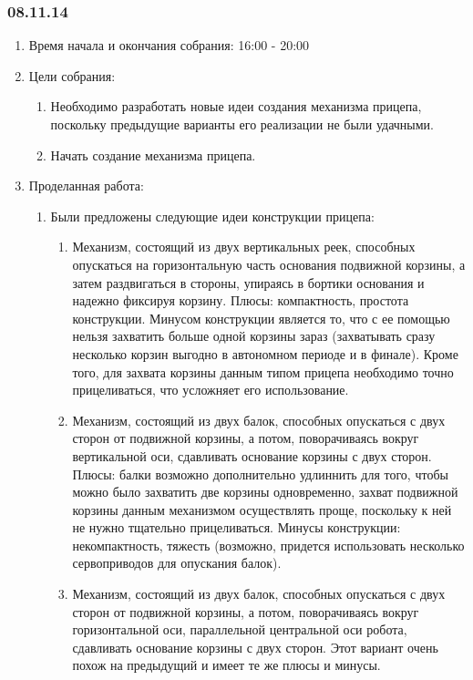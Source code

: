 
\subsubsection{08.11.14}

\begin{enumerate}
	\item Время начала и окончания собрания:
	16:00 - 20:00
	\item Цели собрания:
	\begin{enumerate}
		\item Необходимо разработать новые идеи создания механизма прицепа, поскольку предыдущие варианты его реализации не были удачными.
		
		\item Начать создание механизма прицепа.
		
	\end{enumerate}
	
	\item Проделанная работа:
	\begin{enumerate}
		\item Были предложены следующие идеи конструкции прицепа:
		\begin{enumerate}
			\item Механизм, состоящий из двух вертикальных реек, способных опускаться на горизонтальную часть основания подвижной корзины, а затем раздвигаться в стороны, упираясь в бортики основания и надежно фиксируя корзину. Плюсы: компактность, простота конструкции. Минусом конструкции является то, что с ее помощью нельзя захватить больше одной корзины зараз (захватывать сразу несколько корзин выгодно в автономном периоде и в финале). Кроме того, для захвата корзины данным типом прицепа необходимо точно прицеливаться, что усложняет его использование.
			
			\item Механизм, состоящий из двух балок, способных опускаться с двух сторон от подвижной корзины, а потом, поворачиваясь вокруг вертикальной оси, сдавливать основание корзины с двух сторон. Плюсы: балки возможно дополнительно удлиннить для того, чтобы можно было захватить две корзины одновременно, захват подвижной корзины данным механизмом осуществлять проще, поскольку к ней не нужно тщательно прицеливаться. Минусы конструкции: некомпактность, тяжесть (возможно, придется использовать несколько сервоприводов для опускания балок).
			
			\item Механизм, состоящий из двух балок, способных опускаться с двух сторон от подвижной корзины, а потом, поворачиваясь вокруг горизонтальной оси, параллельной центральной оси робота, сдавливать основание корзины с двух сторон. Этот вариант очень похож на предыдущий и имеет те же плюсы и минусы.
			

\end{enumerate}
\end{enumerate}
\end{enumerate}

